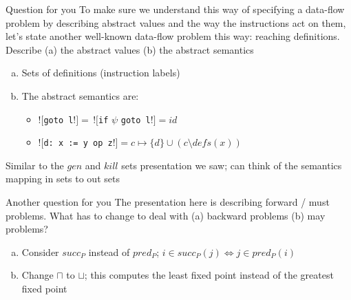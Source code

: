 \documentclass{beamer}
\begin{document}
\begin{frame}{Question for you}
To make sure we understand this way of specifying a data-flow problem by
describing abstract values and the way the instructions act on them, let's
state another well-known data-flow problem this way: reaching definitions.
Describe (a) the abstract values (b) the abstract semantics

\begin{enumerate}[(a)]
\pause \item Sets of definitions (instruction labels)
\pause \item The abstract semantics are:
\begin{itemize}
\item $![${\tt goto l}$!] = \, ![${\tt if} $\psi$ {\tt goto l}$!] = id$
\item $![${\tt d: x := y op z}$!] = c \mapsto \{d\} \cup (c \setminus defs(x))$
\end{itemize}
\end{enumerate}
Similar to the $gen$ and $kill$ sets presentation we saw; can think
of the semantics mapping in sets to out sets
\end{frame}

\begin{frame}{Another question for you}
The presentation here is describing forward / must problems. What has to
change to deal with (a) backward problems (b) may problems?
\begin{enumerate}[(a)]
\pause
\item Consider $succ_P$ instead of $pred_P$; $i \in succ_P(j) \iff j \in pred_P(i)$
\pause
\item Change $\sqcap$ to $\sqcup$; this computes the least fixed point
instead of the greatest fixed point
\end{enumerate}
\end{frame}
\end{document}

